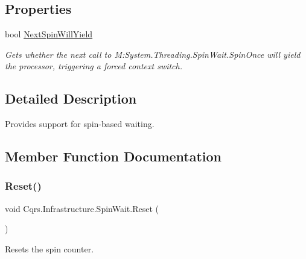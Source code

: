 \subsection*{Properties}
\begin{DoxyCompactItemize}
\item 
bool \hyperlink{structCqrs_1_1Infrastructure_1_1SpinWait_a8bf89d0140fcedc664f18b41229cda0a}{Next\+Spin\+Will\+Yield}
\begin{DoxyCompactList}\small\item\em Gets whether the next call to M\+:\+System.\+Threading.\+Spin\+Wait.\+Spin\+Once will yield the processor, triggering a forced context switch. \end{DoxyCompactList}\end{DoxyCompactItemize}


\subsection{Detailed Description}
Provides support for spin-\/based waiting. 



\subsection{Member Function Documentation}
\mbox{\label{structCqrs_1_1Infrastructure_1_1SpinWait_a32a06438f849dc88a0fce77b23e3271e}} 
\subsubsection{\texorpdfstring{Reset()}{Reset()}}
{\footnotesize\ttfamily void Cqrs.\+Infrastructure.\+Spin\+Wait.\+Reset (\begin{DoxyParamCaption}{ }\end{DoxyParamCaption})}



Resets the spin counter. 

\mbox{\label{structCqrs_1_1Infrastructure_1_1SpinWait_a2df9b40d5281fda47702cc99fac7e6d3}} 

